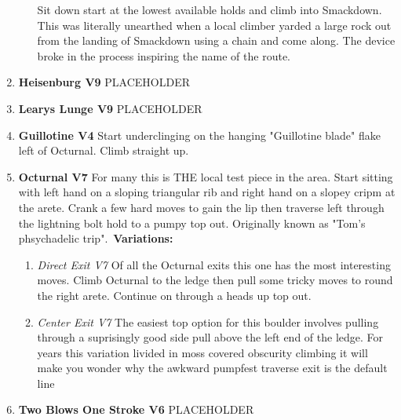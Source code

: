 \begin{enumerate}[]
\begin{enumerate}
		\newline Sit down start at the lowest available holds and climb into Smackdown. This was literally unearthed when a local climber yarded a large rock out from the landing of Smackdown using a chain and come along. The device broke in the process inspiring the name of the route.\
	\end{enumerate}
	\item\label{rt:Heisenburg} \colorbox{Goldenrod!50}{\textbf{Heisenburg V9  } }
	\newline PLACEHOLDER\
	\item\label{rt:Learys Lunge} \colorbox{Goldenrod!50}{\textbf{Learys Lunge V9  } }
	\newline PLACEHOLDER\
	\item\label{rt:Guillotine} \colorbox{RoyalBlue!20}{\textbf{Guillotine V4     } }
	\newline Start underclinging on the hanging "Guillotine blade" flake left of Octurnal. Climb straight up.\
	\item\label{rt:Octurnal} \colorbox{Goldenrod!50}{\textbf{Octurnal V7       } }
	\newline For many this is THE local test piece in the area. Start sitting with left hand on a sloping triangular rib and right hand on a slopey cripm at the arete. Crank a few hard moves to gain the lip then traverse left through the lightning bolt hold to a pumpy top out. Originally known as "Tom's phsychadelic trip".\
	\newline \textbf{Variations:}
	\begin{enumerate}
		\item\label{vr:Direct Exit} \colorbox{Goldenrod!50}{\emph{Direct Exit V7       }  }
		\newline Of all the Octurnal exits this one has the most interesting moves. Climb Octurnal to the ledge then pull some tricky moves to round the right arete. Continue on through a heads up top out.\
		\item\label{vr:Center Exit} \colorbox{Goldenrod!50}{\emph{Center Exit V7   \ding{72} \ding{72}  }  }
		\newline The easiest top option for this boulder involves pulling through a suprisingly good side pull above the left end of the ledge. For years this variation livided in moss covered obscurity climbing it will make you wonder why the awkward pumpfest traverse exit is the default line\
	\end{enumerate}
	\item\label{rt:Two Blows One Stroke} \colorbox{Goldenrod!50}{\textbf{Two Blows One Stroke V6  } }
	\newline PLACEHOLDER\
\end{enumerate}
